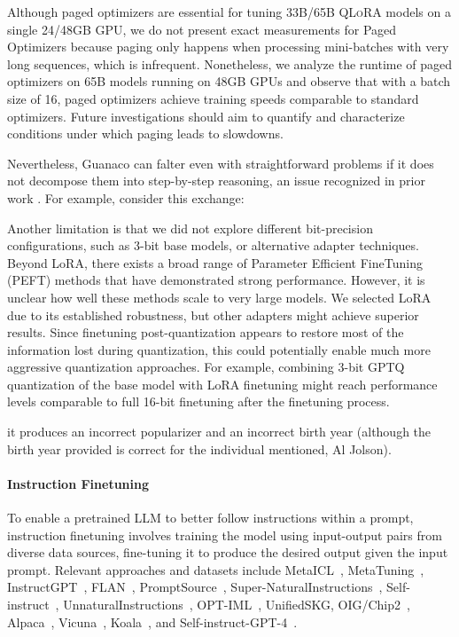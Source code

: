 Although paged optimizers are essential for tuning 33B/65B \textsc{QLoRA} models on a single 24/48GB GPU, we do not present exact measurements for Paged Optimizers because paging only happens when processing mini-batches with very long sequences, which is infrequent. Nonetheless, we analyze the runtime of paged optimizers on 65B models running on 48GB GPUs and observe that with a batch size of 16, paged optimizers achieve training speeds comparable to standard optimizers. Future investigations should aim to quantify and characterize conditions under which paging leads to slowdowns.

Nevertheless, {Guanaco} can falter even with straightforward problems if it does not decompose them into step-by-step reasoning, an issue recognized in prior work \cite{weichain}. For example, consider this exchange:

Another limitation is that we did not explore different bit-precision configurations, such as 3-bit base models, or alternative adapter techniques. Beyond LoRA, there exists a broad range of Parameter Efficient FineTuning (PEFT) methods that have demonstrated strong performance. However, it is unclear how well these methods scale to very large models. We selected LoRA due to its established robustness, but other adapters might achieve superior results. Since finetuning post-quantization appears to restore most of the information lost during quantization, this could potentially enable much more aggressive quantization approaches. For example, combining 3-bit GPTQ quantization of the base model with LoRA finetuning might reach performance levels comparable to full 16-bit finetuning after the finetuning process.

it produces an incorrect popularizer and an incorrect birth year (although the birth year provided is correct for the individual mentioned, Al Jolson).

\paragraph{Instruction Finetuning} To enable a pretrained LLM to better follow instructions within a prompt, instruction finetuning involves training the model using input-output pairs from diverse data sources, fine-tuning it to produce the desired output given the input prompt. Relevant approaches and datasets include MetaICL~\citep{min2021metaicl}, MetaTuning~\citep{zhong2021adapting}, InstructGPT~\citep{ouyang2022training}, FLAN~\citep{wei2021finetuned,chung2022scaling}, PromptSource~\citep{bach2022promptsource}, Super-NaturalInstructions~\citep{wang2022super,sanh2021multitask}, Self-instruct~\citep{wang2022self}, UnnaturalInstructions~\citep{honovich2022unnatural}, OPT-IML~\citep{iyer2022opt}, UnifiedSKG\citep{xie2022unifiedskg}, OIG/Chip2~\citep{laion2023}, Alpaca~\citep{alpaca}, Vicuna~\citep{vicuna2023}, Koala~\citep{koala_blogpost_2023}, and Self-instruct-GPT-4~\citep{peng2023instruction}.

